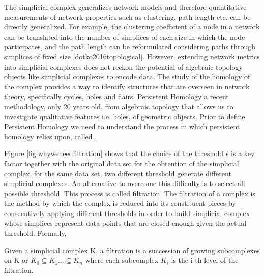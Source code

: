\documentclass[onecollarge,runningheads]{svjour2}
\begin{document}
The simplicial complex generalizes network models and therefore quantitative measurements of network properties such as clustering, path length etc. can be directly generalized. For example, the clustering coefficient of a node in a network can be translated into the number of simplices of each size in which the node participates, and the path length can be reformulated considering paths through simplices of fixed size \ref{dotko2016topological}. However, extending network metrics into simplicial complexes does not reckon the potential of algebraic topology objects like simplicial complexes to encode data. 
The study of the homology of the complex provides a way to identify structures that are overseen in network theory, specifically cycles, holes and flairs. Persistent Homology a recent methodology, only 20 years old, from algebraic topology that allows us to investigate qualitative features i.e. holes, of geometric objects. Prior to define Persistent Homology we need to understand the process in which persistent homology relies upon, called .

Figure \ref{fig:whyweneedfiltration} shows that the choice of the threshold $\epsilon$ is a key factor together with the original data set for the obtention of the simplicial complex, for the same data set, two different threshold generate different simplicial complexes. 
An alternative to overcome this difficulty is to select all possible threshold. This process is called filtration. The filtration of a complex is the method by which the complex is reduced into its constituent pieces by consecutively applying different thresholds in order to build simplicial complex whose simplices represent data points that are closed enough given the actual threshold. 
Formally,
\begin{definition}
Given a simplicial complex K, a filtration is a succession of growing subcomplexes  on K or $K_0 \subseteq K_1 ...   \subseteq K_n$ where each subcomplex $K_i$ is the i-th level of the filtration. 
\end{definition}
\end{document}

